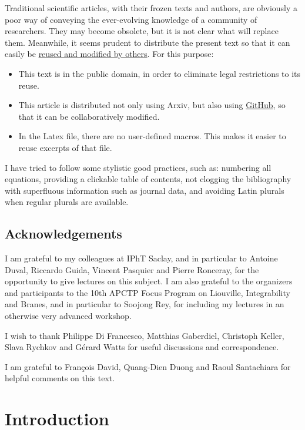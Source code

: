 \documentclass[12pt,a4paper,notitlepage]{report}
\numberwithin{equation}{section}
\theoremstyle{break}
\begin{document}
Traditional scientific articles, with their frozen texts and authors, are obviously a poor way of conveying the ever-evolving knowledge of a community of researchers.
They may become obsolete, but it is not clear what will replace them.
Meanwhile, it seems prudent to distribute the present text so that it can easily be 
\href{http://researchpracticesandtools.blogspot.fr/2014/02/the-case-for-emancipating-articles-from.html}
{reused and modified by others}.
For this purpose:
\begin{itemize}
 \item This text is in the public domain, in order to eliminate legal restrictions to its reuse. 
\item This article is distributed not only using Arxiv, but also using \href{https://github.com/ribault/CFT-Review}{GitHub}, so that it can be collaboratively modified. 
\item In the Latex file, there are no user-defined macros.
This makes it easier to reuse excerpts of that file. 
\end{itemize}

I have tried to follow some stylistic good practices, such as: numbering all equations, providing a clickable table of contents, not clogging the bibliography with superfluous information such as journal data, and avoiding Latin plurals when regular plurals are available.


\section{Acknowledgements}

I am grateful to my colleagues at IPhT Saclay, and in particular to Antoine Duval, Riccardo Guida, Vincent Pasquier and Pierre Ronceray, for the opportunity to give lectures on this subject. I am also grateful to the organizers and participants to the 10th APCTP Focus Program on Liouville, Integrability and Branes, and in particular to Soojong Rey, for including my lectures in an otherwise very advanced workshop. 

I wish to thank Philippe Di Francesco, Matthias Gaberdiel, Christoph Keller, Slava Rychkov and G\'erard Watts for useful discussions and correspondence.

I am grateful to Fran\c{c}ois David, Quang-Dien Duong and Raoul Santachiara for helpful comments on this text.


\chapter{Introduction \label{secintr}}
\end{document}
